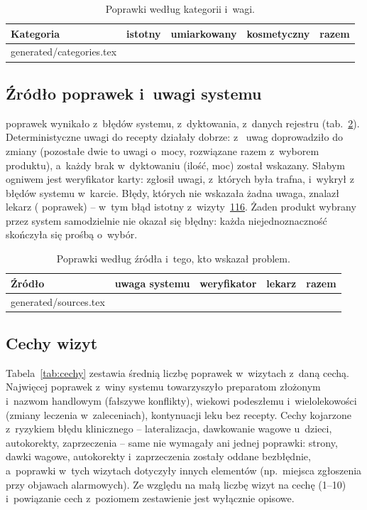 \documentclass[11pt,a4paper]{article}
\makeatletter
\newcommand*{\tabinput}[1]{\@@input #1 }
\newcommand{\wizyta}[1]{\hyperref[wizyta:#1]{#1}}
\makeatother
\begin{document}
\begin{table}[ht]
\centering
\caption{Poprawki według kategorii i~wagi.}\label{tab:kategorie}
\begin{tabular}{@{}l r r r r@{}}
\toprule
Kategoria & istotny & umiarkowany & kosmetyczny & razem \\
\midrule
\tabinput{generated/categories.tex}
\bottomrule
\end{tabular}
\end{table}

\subsection{Źródło poprawek i~uwagi systemu}
\nSrcSystem{} poprawek wynikało z~błędów systemu, \nSrcDictation{} z~dyktowania, \nSrcRegistry{} z~danych rejestru
(tab.~\ref{tab:zrodla}). Deterministyczne uwagi do recepty działały dobrze: z~\nIssuesStageOne{} uwag \nIssuesStageOneActed{}
doprowadziło do zmiany (pozostałe dwie to uwagi o~mocy, rozwiązane razem z~wyborem produktu), a~każdy brak w~dyktowaniu
(ilość, moc) został wskazany. Słabym ogniwem jest weryfikator karty: zgłosił \nIssuesStageTwo{} uwagi, z~których
\nIssuesStageTwoActed{} była trafna, i~wykrył \nStageTwoSystemByVerifier{} z~\nStageTwoSystem{} błędów systemu w~karcie.
Błędy, których nie wskazała żadna uwaga, znalazł lekarz (\nDetDoctor{} poprawek) -- w~tym błąd istotny z~wizyty~\wizyta{116}.
Żaden produkt wybrany przez system samodzielnie nie okazał się błędny: każda niejednoznaczność skończyła się prośbą o~wybór.

\begin{table}[ht]
\centering
\caption{Poprawki według źródła i~tego, kto wskazał problem.}\label{tab:zrodla}
\begin{tabular}{@{}l r r r r@{}}
\toprule
Źródło & uwaga systemu & weryfikator & lekarz & razem \\
\midrule
\tabinput{generated/sources.tex}
\bottomrule
\end{tabular}
\end{table}

\subsection{Cechy wizyt}
Tabela~\ref{tab:cechy} zestawia średnią liczbę poprawek w~wizytach z~daną cechą. Najwięcej poprawek z~winy systemu
towarzyszyło preparatom złożonym i~nazwom handlowym (fałszywe konflikty), wiekowi podeszłemu i~wielolekowości
(zmiany leczenia w~zaleceniach), kontynuacji leku bez recepty. Cechy kojarzone z~ryzykiem błędu klinicznego --
lateralizacja, dawkowanie wagowe u~dzieci, autokorekty, zaprzeczenia -- same nie wymagały ani jednej poprawki: strony,
dawki wagowe, autokorekty i~zaprzeczenia zostały oddane bezbłędnie, a~poprawki w~tych wizytach dotyczyły innych elementów
(np.\ miejsca zgłoszenia przy objawach alarmowych).
Ze względu na małą liczbę wizyt na cechę (1--10) i~powiązanie cech z~poziomem zestawienie jest wyłącznie opisowe.
\end{document}
